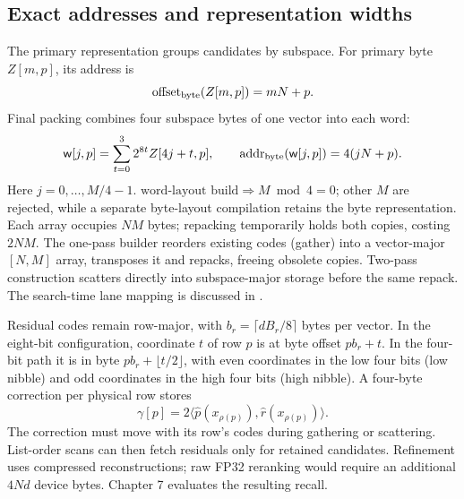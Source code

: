 \subsection{Exact addresses and representation widths}

The primary representation groups candidates by subspace. For primary
byte $Z[m,p]$, its address is
\[
 \operatorname{offset}_{\rm byte}(Z[m,p])=mN+p.
\]
Final packing combines four subspace bytes of one vector into each word:
\begin{equation}
 \mathsf w[j,p]=\sum_{t=0}^{3}2^{8t}Z[4j+t,p],\qquad
 \operatorname{addr}_{\rm byte}(\mathsf w[j,p])=4(jN+p).
 \label{eq:4-primary-address}
\end{equation}
Here $j=0,\ldots,M/4-1$. $\text{word-layout build}\Longrightarrow M\bmod4=0$;
other $M$ are rejected, while a separate byte-layout compilation retains
the byte representation. Each array occupies $NM$ bytes; repacking
temporarily holds both copies, costing $2NM$. The one-pass builder
reorders existing codes (gather) into a vector-major $[N,M]$ array,
transposes it and repacks, freeing obsolete copies. Two-pass construction
scatters directly into subspace-major storage before the same repack.
The search-time lane mapping is discussed in .

Residual codes remain row-major, with $b_r=\lceil dB_r/8\rceil$ bytes per
vector. In the eight-bit configuration, coordinate $t$ of row $p$ is
at byte offset $pb_r+t$. In the four-bit path it is in byte
$pb_r+\lfloor t/2\rfloor$, with even coordinates in the low four bits
(low nibble) and odd coordinates in the high four bits (high nibble).
A four-byte correction per physical row stores
\begin{equation}
 \gamma[ p ]=2\langle\widehat p(x_{\rho(p)}),
                              \widehat r(x_{\rho(p)})\rangle.
 \label{eq:4-correction}
\end{equation}
The correction must move with its row's codes during gathering or
scattering. List-order scans can then fetch residuals only for retained
candidates. Refinement uses compressed reconstructions; raw FP32
reranking would require an additional $4Nd$ device bytes. Chapter 7
evaluates the resulting recall.
